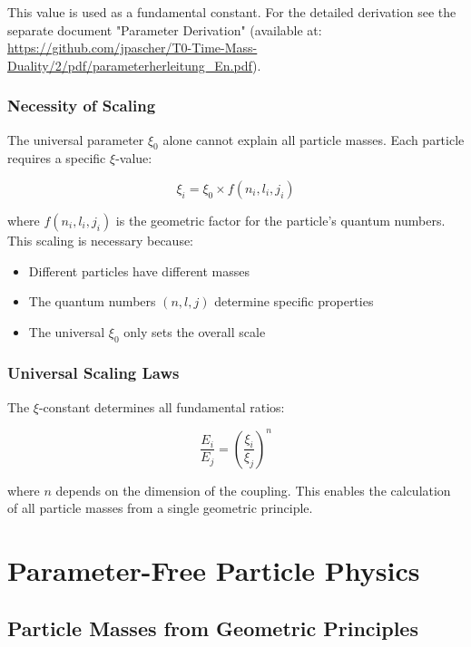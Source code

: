 \documentclass[12pt,a4paper]{report}
\begin{document}
\begin{important}
	This value is used as a fundamental constant. For the detailed derivation 
	see the separate document "Parameter Derivation" 
	(available at: \url{https://github.com/jpascher/T0-Time-Mass-Duality/2/pdf/parameterherleitung_En.pdf}).
\end{important}

\subsection{Necessity of Scaling}

The universal parameter $\xi_0$ alone cannot explain all particle masses. Each particle requires a specific $\xi$-value:

\begin{equation}
	\xi_i = \xi_0 \times f(n_i, l_i, j_i)
\end{equation}

where $f(n_i, l_i, j_i)$ is the geometric factor for the particle's quantum numbers. This scaling is necessary because:

\begin{itemize}
	\item Different particles have different masses
	\item The quantum numbers $(n, l, j)$ determine specific properties
	\item The universal $\xi_0$ only sets the overall scale
\end{itemize}

\subsection{Universal Scaling Laws}

The $\xi$-constant determines all fundamental ratios:

\begin{equation}
	\frac{E_i}{E_j} = \left(\frac{\xi_i}{\xi_j}\right)^n
\end{equation}

where $n$ depends on the dimension of the coupling. This enables the calculation of all particle masses from a single geometric principle.
	\chapter{Parameter-Free Particle Physics}
	
	\section{Particle Masses from Geometric Principles}
	
\end{document}
